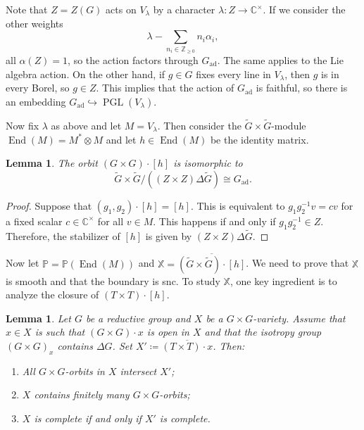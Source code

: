 \documentclass{amsart}
\newtheorem{lem}[thm]{Lemma}
\theoremstyle{definition}
\theoremstyle{remark}
\theoremstyle{plain}
\theoremstyle{definition}
\theoremstyle{remark}
\newcommand{\C}{\mathbb{C}}
\newcommand{\Z}{\mathbb{Z}}
\renewcommand{\P}{\mathbb{P}}
\newcommand{\mbb}[1]{\mathbb{#1}}
\newcommand{\on}[1]{\operatorname{#1}}
\newcommand{\ol}[1]{\overline{#1}}
\newcommand{\1}{\mathbf{1}}
\newcommand{\2}{\mathbf{2}}
\newcommand{\3}{\mathbf{3}}
\DeclareMathOperator{\End}{End}
\DeclareMathOperator{\ad}{ad}
\begin{document}
Note that \(Z = Z(G)\) acts on \(V_{\lambda}\) by a character \(\lambda \colon Z \to \C^{\times}\). If we consider the other weights
\[ \lambda - \sum_{n_i \in \Z_{\geq 0}} n_i \alpha_i, \]
all \(\alpha(Z) = 1\), so the action factors through \(G_{\ad}\). The same applies to the Lie algebra action. On the other hand, if \(g \in G\) fixes every line in \(V_{\lambda}\), then \(g\) is in every Borel, so \(g \in Z\). This implies that the action of \(G_{\ad}\) is faithful, so there is an embedding \(G_{\on{ad}} \hookrightarrow \on{PGL}(V_{\lambda})\).

Now fix \(\lambda\) as above and let \(M = V_{\lambda}\). Then consider the \(\tilde{G} \times \tilde{G}\)-module \(\End(M) = M^* \otimes M\) and let \(h \in \End(M)\) be the identity matrix.

\begin{lem}
    The orbit \((G \times G) \cdot [h]\) is isomorphic to
    \[ \tilde{G} \times \tilde{G} / ((Z \times Z )\Delta \tilde{G}) \cong G_{\ad}. \]
\end{lem}

\begin{proof}
    Suppose that \((g_1, g_2) \cdot [h] = [h]\). This is equivalent to \(g_1 g_2^{-1} v = cv\) for a fixed scalar \(c \in \C^{\times}\) for all \(v \in M\). This happens if and only if \(g_1 g_2^{-1} \in Z\). Therefore, the stabilizer of \([h]\) is given by \((Z \times Z) \Delta \tilde{G}\).
\end{proof}

Now let \(\P = \P(\End(M))\) and \(\mbb{X} = \ol{(\tilde{G} \times \tilde{G}) \cdot [h]}\). We need to prove that \(\mbb{X}\) is smooth and that the boundary is snc. To study \(\mbb{X}\), one key ingredient is to analyze the closure of \((T \times T) \cdot [h]\).

\begin{lem}
    Let \(G\) be a reductive group and \(X\) be a \(G \times G\)-variety. Assume that \(x \in X\) is such that \((G \times G) \cdot x\) is open in \(X\) and that the isotropy group \((G \times G)_x\) contains \(\Delta G\). Set \(X' \coloneqq \ol{(T \times T) \cdot x}\). Then:
    \begin{enumerate}
        \item All \(G \times G\)-orbits in \(X\) intersect \(X'\);
        \item \(X\) contains finitely many \(G \times G\)-orbits;
        \item \(X\) is complete if and only if \(X'\) is complete.
    \end{enumerate}
\end{lem}
\end{document}
